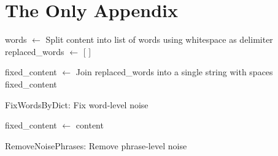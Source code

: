 \chapter{The Only Appendix}
\label{app:A}

\begin{algorithm}

    words $\gets$ Split content into list of words using whitespace as delimiter\;
    replaced\_words $\gets$ [ ]\;

    fixed\_content $\gets$ Join replaced\_words into a single string with spaces\;
    \Return fixed\_content\;
    \caption{FixWordsByDict: Fix word-level noise}
    \label{alg:word_level_noise_fix}
\end{algorithm}


\begin{algorithm}


    fixed\_content $\gets$ content\;


    \caption{RemoveNoisePhrases: Remove phrase-level noise}
    \label{alg:phrase_level_noise_fix}
\end{algorithm}
